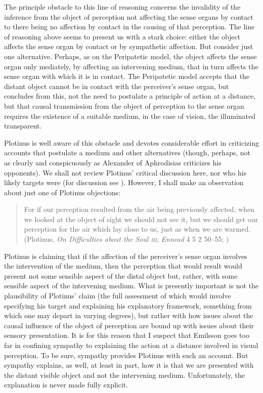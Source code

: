 The principle obstacle to this line of reasoning concerns the invalidity of the inference from the object of perception not affecting the sense organs by contact to there being no affection by contact in the causing of that perception. The line of reasoning above seems to present us with a stark choice: either the object affects the sense organ by contact or by sympathetic affection. But consider just one alternative. Perhaps, as on the Peripatetic model, the object affects the sense organ only mediately, by affecting an intervening medium, that in turn affects the sense organ with which it is in contact. The Peripatetic model accepts that the distant object cannot be in contact with the perceiver's sense organ, but concludes from this, not the need to postulate a principle of action at a distance, but that causal transmission from the object of perception to the sense organ requires the existence of a suitable medium, in the case of vision, the illuminated transparent.

Plotinus is well aware of this obstacle and devotes considerable effort in criticizing accounts that postulate a medium and other alternatives (though, perhaps, not as clearly and conspicuously as Alexander of Aphrodisias criticizes his opponents). We shall not review Plotinus' critical discussion here, nor who his likely targets were (for discussion see \citealt[chapter 3.1]{Emilsson:1988uq}). However, I shall make an observation about just one of Plotinus objections:
\begin{quote}
	For if our perception resulted from the air being previously affected, when we looked at the object of sight we should not see it, but we should get our perception for the air which lay close to us, just as when we are warmed. (Plotinus, \emph{On Difficulties about the Soul \textsc{iii}}, \emph{Ennead} 4 5 2 50--55; \citealt[289]{Armstrong:1984aa})
\end{quote}
Plotinus is claiming that if the affection of the perceiver's sense organ involves the intervention of the medium, then the perception that would result would present not some sensible aspect of the distal object but, rather, with some sensible aspect of the intervening medium. What is presently important is not the plausibility of Plotinus' claim (the full assessment of which would involve specifying his target and explaining his explanatory framework, something from which one may depart in varying degrees), but rather with how issues about the causal influence of the object of perception are bound up with issues about their sensory presentation. It is for this reason that I suspect that Emilsson goes too far in confining sympathy to explaining the action at a distance involved in visual perception. To be sure, sympathy provides Plotinus with such an account. But sympathy explains, as well, at least in part, how it is that we are presented with the distant visible object and not the intervening medium. Unfortunately, the explanation is never made fully explicit.

